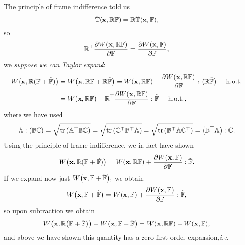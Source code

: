 \documentclass[11pt]{scrartcl} %
\begin{document}
The principle of frame indifference told us 
\[
	\tilde{\mathbb{T}}\qty(\vb{x}, \mathbb{R} \mathbb{F}) = \mathbb{R} \tilde{\mathbb{T}}\qty(\vb{x}, \mathbb{F}),
\]
so
\[
	\mathbb{R}^\top \pdv{W\qty(\vb{x}, \ensuremath{\mathbb{R}} \ensuremath{\mathbb{F}})}{\ensuremath{\mathbb{F}}} = \pdv{W\qty(\vb{x}, \ensuremath{\mathbb{F}})}{\ensuremath{\mathbb{F}}},
\]
we \textit{suppose we can Taylor expand}:
\begin{align*}
	W\qty(\vb{x}, \mathbb{R}(\mathbb{F} + \tilde{\mathbb{F}})) &= W\qty(\vb{x}, \mathbb{R}\mathbb{F} + \mathbb{R}\tilde{\mathbb{F}}) = W\qty(\vb{x}, \mathbb{R} \mathbb{F}) + \pdv{W\qty(\vb{x},\ensuremath{\mathbb{R}} \ensuremath{\mathbb{F}})}{\ensuremath{\mathbb{F}}}:\qty(\mathbb{R} \tilde{\mathbb{F}}) + \, \text{h.o.t.} \, \\
							    &= W\qty(\vb{x}, \mathbb{R}\mathbb{F})+ \mathbb{R}^\top \pdv{W\qty(\vb{x}, \ensuremath{\mathbb{R}}\ensuremath{\mathbb{F}})}{\ensuremath{\mathbb{F}}}:\tilde{\mathbb{F}} + \, \text{h.o.t.} \,,
\end{align*}
where we have used
\[
	\tensorq{A}:\qty(\tensorq{B}\tensorq{C}) = \sqrt{\trace\qty(\transpose{\tensorq{A}} \tensorq{B}\tensorq{C})} = \sqrt{\trace \qty(\transpose{\tensorq{C}} \transpose{\tensorq{B}} \tensorq{A})} = \sqrt{\trace\qty(\transpose{\tensorq{B}}\tensorq{A} \transpose{\tensorq{C}})} = \qty(\transpose{\tensorq{B}}\tensorq{A}): \tensorq{C}.
\]
Using the principle of frame indifference, we in fact have shown
\[
	W\qty(\vb{x},\mathbb{R}(\mathbb{F}+\tilde{\mathbb{F}})) = W\qty(\vb{x},\mathbb{R}\mathbb{F})+ \pdv{W\qty(\vb{x},\ensuremath{\mathbb{F}})}{\ensuremath{\mathbb{F}}}: \tilde{\mathbb{F}}.
\]
If we expand now just $W\qty(\vb{x}, \mathbb{F} + \tilde{\mathbb{F}}),$ we obtain
\[
	W\qty(\vb{x}, \mathbb{F} + \tilde{\mathbb{F}}) = W\qty(\vb{x}, \mathbb{F}) + \pdv{W\qty(\vb{x}, \ensuremath{\mathbb{F}})}{\ensuremath{\mathbb{F}}}: \tilde{\mathbb{F}},
\]
so upon subtraction we obtain 
\[
	W\qty(\vb{x}, \mathbb{R}\qty(\mathbb{F} + \tilde{\mathbb{F}})) - W\qty(\vb{x}, \mathbb{F} + \tilde{\mathbb{F}}) = W\qty(\vb{x}, \mathbb{R} \mathbb{F}) - W\qty(\vb{x}, \mathbb{F}),
\]
and above we have shown this quantity has a zero first order expansion,\textit{i.e.}
\end{document}
